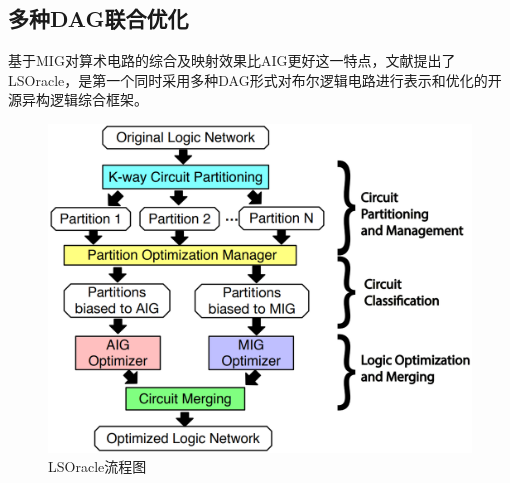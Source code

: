 \subsection{多种DAG联合优化}

基于MIG对算术电路的综合及映射效果比AIG更好这一特点，文献\cite{LS:LSOracle}提出了LSOracle，是第一个同时采用多种DAG形式对布尔逻辑电路进行表示和优化的开源异构逻辑综合框架。

\begin{figure}[!htbp]
    \centering
    \includegraphics[width=0.7\linewidth]{./figs/LS-LSOracle-flow.png}
    \caption{LSOracle流程图}
    \label{LS:LSOracle:Fig:flow}
\end{figure}

